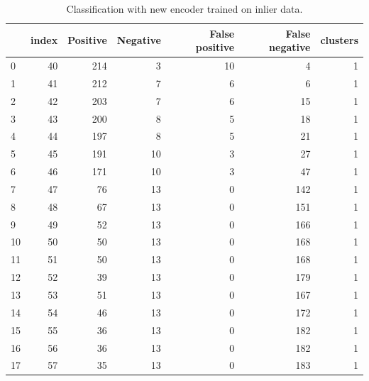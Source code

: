 \documentclass[a4paper,twoside,12pt]{book}
\begin{document}
\begin{appendices}
\begin{table}
	\centering
	\caption{Classification with new encoder trained on inlier data.}
	\label{id:tab:SVMencWLab}
	\begin{tabular}{lrrrrrr}
		\toprule
		{} &  index &  Positive &  Negative &  False positive &  False negative &  clusters \\
		\midrule
		0   &     40 &       214 &         3 &              10 &               4 &         1 \\
		1   &     41 &       212 &         7 &               6 &               6 &         1 \\
		2   &     42 &       203 &         7 &               6 &              15 &         1 \\
		3   &     43 &       200 &         8 &               5 &              18 &         1 \\
		4   &     44 &       197 &         8 &               5 &              21 &         1 \\
		5   &     45 &       191 &        10 &               3 &              27 &         1 \\
		6   &     46 &       171 &        10 &               3 &              47 &         1 \\
		7   &     47 &        76 &        13 &               0 &             142 &         1 \\
		8   &     48 &        67 &        13 &               0 &             151 &         1 \\
		9   &     49 &        52 &        13 &               0 &             166 &         1 \\
		10  &     50 &        50 &        13 &               0 &             168 &         1 \\
		11  &     51 &        50 &        13 &               0 &             168 &         1 \\
		12  &     52 &        39 &        13 &               0 &             179 &         1 \\
		13  &     53 &        51 &        13 &               0 &             167 &         1 \\
		14  &     54 &        46 &        13 &               0 &             172 &         1 \\
		15  &     55 &        36 &        13 &               0 &             182 &         1 \\
		16  &     56 &        36 &        13 &               0 &             182 &         1 \\
		17  &     57 &        35 &        13 &               0 &             183 &         1 \\

\end{tabular}
\end{table}
\end{appendices}
\end{document}
